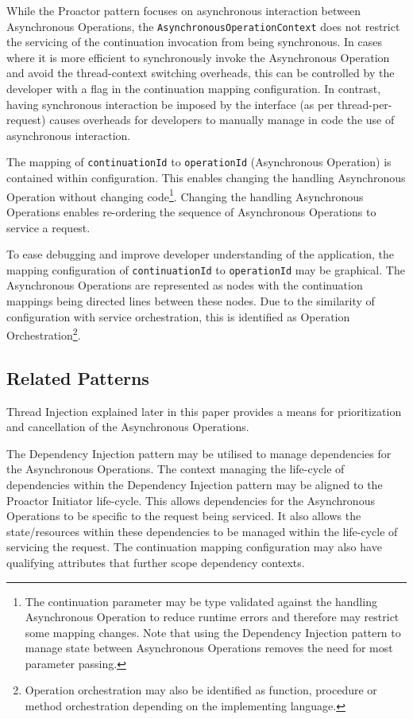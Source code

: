 \documentclass[prodmode]{style/acmlarge}
\begin{document}
While the Proactor pattern focuses on asynchronous interaction between
Asynchronous Operations, the \texttt{AsynchronousOperationContext} does not
restrict the servicing of the continuation invocation from being synchronous.
In cases where it is more efficient to synchronously invoke the Asynchronous
Operation and avoid the thread-context switching overheads, this can be
controlled by the developer with a flag in the continuation mapping
configuration.  In contrast, having synchronous interaction be imposed by the
interface (as per thread-per-request) causes overheads for developers to
manually manage in code the use of asynchronous interaction.

The mapping of \texttt{continuationId} to \texttt{operationId} (Asynchronous
Operation) is contained within configuration.  This enables changing the
handling Asynchronous Operation without changing code\footnote{The continuation
parameter may be type validated against the handling Asynchronous Operation to
reduce runtime errors and therefore may restrict some mapping changes.  Note
that using the Dependency Injection pattern to manage state between Asynchronous
Operations removes the need for most parameter passing.}.  Changing the handling
Asynchronous Operations enables re-ordering the sequence of Asynchronous
Operations to service a request.

To ease debugging and improve developer understanding of the application, the
mapping configuration of \texttt{continuationId}  to \texttt{operationId} may be
graphical.  The Asynchronous Operations are represented as nodes with the
continuation mappings being directed lines between these nodes.  Due to the
similarity of configuration with service orchestration, this is identified
as Operation Orchestration\footnote{Operation orchestration may also be
identified as function, procedure or method orchestration depending on the
implementing language.}.


\subsection{Related Patterns}

Thread Injection explained later in this paper provides a means for
prioritization and cancellation of the Asynchronous Operations.

The Dependency Injection pattern \cite{ioc} may be utilised to manage
dependencies for the Asynchronous Operations.  The context managing the
life-cycle of dependencies within the Dependency Injection pattern may be
aligned to the Proactor Initiator life-cycle.  This allows dependencies for the
Asynchronous Operations to be specific to the request being serviced.  It also
allows the state/resources within these dependencies to be managed within the
life-cycle of servicing the request.  The continuation mapping configuration may
also have qualifying attributes that further scope dependency contexts.
\end{document}
